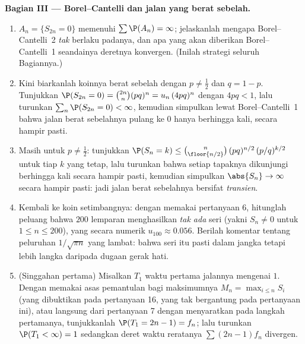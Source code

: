 \begin{problem}
\medskip
\noindent\textbf{Bagian III --- Borel--Cantelli dan jalan yang
berat sebelah.}
\begin{enumerate}[resume]
  \item {} $A_n = \{S_{2n} = 0\}$ memenuhi $\sum\P(A_n)
        = \infty$; jelaskanlah mengapa Borel--Cantelli~2 \emph{tak}
        berlaku padanya, dan apa yang akan diberikan Borel--Cantelli~1
        seandainya deretnya konvergen. (Inilah strategi seluruh Bagiannya.)
  \item Kini biarkanlah koinnya berat sebelah dengan $p \neq \frac12$ dan $q = 1 -
        p$. Tunjukkan $\P(S_{2n} = 0) = \binom{2n}n(pq)^n =
        u_n\,(4pq)^n$ dengan $4pq < 1$, lalu turunkan
        $\sum_n\P(S_{2n} = 0) < \infty$, kemudian simpulkan lewat
        Borel--Cantelli~1 bahwa jalan berat sebelahnya pulang ke $0$
        hanya berhingga kali, secara hampir pasti.
  \item Masih untuk $p \neq \frac12$: tunjukkan $\P(S_n = k) \leq
        \binom{n}{\floor{n/2}}\,(pq)^{n/2}\,(p/q)^{k/2}$ untuk
        tiap $k$ yang tetap, lalu turunkan bahwa setiap tapaknya dikunjungi
        berhingga kali secara hampir pasti, kemudian simpulkan
        $\abs{S_n} \to \infty$ secara hampir pasti: jadi jalan berat sebelahnya
        bersifat \emph{transien}.
  \item Kembali ke koin setimbangnya: dengan memakai pertanyaan 6, hitunglah
        peluang bahwa $200$ lemparan menghasilkan \emph{tak ada} seri
        (yakni $S_n \neq 0$ untuk $1 \leq n \leq 200$), yang secara numerik
        $u_{100} \approx 0.056$. Berilah komentar tentang peluruhan
        $1/\sqrt{\pi n}$ yang lambat: bahwa seri itu pasti dalam jangka
         tetapi lebih langka daripada dugaan gerak hati.
  \item (Singgahan pertama) Misalkan $T_1$ waktu pertama jalannya
        mengenai $1$. Dengan memakai asas pemantulan bagi maksimumnya
        $M_n = \max_{i\leq n}S_i$ (yang dibuktikan pada pertanyaan
        16, yang tak bergantung pada pertanyaan ini), atau langsung
        dari pertanyaan 7 dengan menyaratkan pada langkah pertamanya,
        tunjukkanlah $\P(T_1 = 2n - 1) = f_n$; lalu turunkan $\P(T_1 <
        \infty) = 1$ sedangkan deret waktu reratanya
        $\sum(2n-1)f_n$ divergen.
\end{enumerate}


\end{problem}
